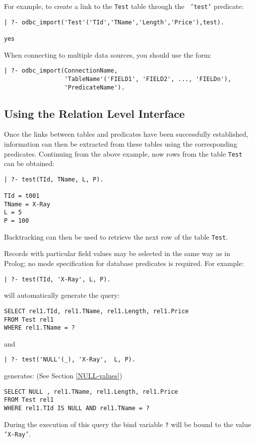 For example, to create a link to the {\tt Test} table through the {\tt
'test'} predicate:
\begin{verbatim}
| ?- odbc_import('Test'('TId','TName','Length','Price'),test).

yes
\end{verbatim}

When connecting to multiple data sources, you should use the form:
\begin{verbatim}
| ?- odbc_import(ConnectionName,
                 'TableName'('FIELD1', 'FIELD2', ..., 'FIELDn'),
                 'PredicateName').
\end{verbatim}


\subsection{Using the Relation Level Interface}

Once the links between tables and predicates have been successfully established, 
information can then be extracted from these tables using the corresponding 
predicates.   Continuing from the above example, now rows from the table 
{\tt Test} can be obtained:
%
\begin{verbatim}
| ?- test(TId, TName, L, P).

TId = t001
TName = X-Ray
L = 5
P = 100 
\end{verbatim}
%
Backtracking can then be used to retrieve the next row of the table {\tt Test}.

Records with particular field values may be selected in the same way
as in Prolog; no mode specification for database predicates is
required. For example:
%
\begin{verbatim}
| ?- test(TId, 'X-Ray', L, P).
\end{verbatim}
will automatically generate the query:
\begin{verbatim}
SELECT rel1.TId, rel1.TName, rel1.Length, rel1.Price
FROM Test rel1
WHERE rel1.TName = ?
\end{verbatim}
and 
\begin{verbatim}
| ?- test('NULL'(_), 'X-Ray',  L, P).
\end{verbatim}
generates: (See Section \ref{NULL-values})
\begin{verbatim}
SELECT NULL , rel1.TName, rel1.Length, rel1.Price
FROM Test rel1
WHERE rel1.TId IS NULL AND rel1.TName = ?
\end{verbatim}
%
During the execution of this query the bind variable {\tt ?} will be bound
to the value {\tt 'X-Ray'}.\newline

